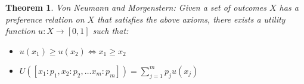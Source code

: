\documentclass[11pt]{book}
\newtheorem{theorem}[corollary]{Theorem}
\begin{document}
\begin{theorem}
    Von Neumann and Morgenstern: Given a set of outcomes $X$ has a preference
    relation on $X$ that satisfies the above axioms, there exists a utility function
    $u: X \rightarrow [0, 1]$ such that:
    \begin{itemize}
        \item $u(x_1) \geq u(x_2) \iff x_1 \geq x_2$
        \item $U([x_1: p_1, x_2:p_2, \dots x_m:p_m]) = \sum_{j=1}^m p_j u(x_j)$
    \end{itemize}
\end{theorem}
\end{document}
